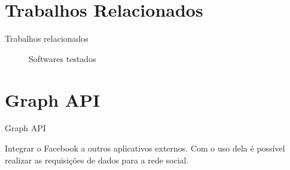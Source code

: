 \documentclass{aula-ifb}
\begin{document}
\section{Trabalhos Relacionados}
\begin{frame}{Trabalhos relacionados}
\begin{figure}[h]
	\centering
  	\caption{Softwares testados}
  	\quad %
  	\quad %
  	\vspace{10px}
    \quad %
\label{fig1}
\end{figure}
\end{frame}

\section{Graph API}
\begin{frame}{Graph API}
	\begin{center}
	Integrar o Facebook a outros aplicativos externos. Com o uso dela é possível realizar as requisições de dados para a rede social.
	\end{center}
\end{frame}
\end{document}
